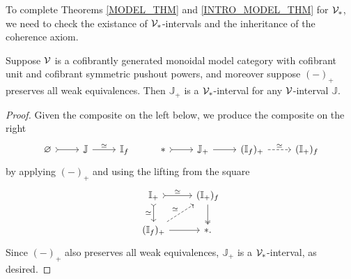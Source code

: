 \documentclass[a4paper,10pt
,draft
]{article}%
\newcommand{\I}{\mathbb I}
\newcommand{\J}{\mathbb J}
\renewcommand{\1}{\eta}%
\begin{document}
{  To complete Theorems \ref{MODEL_THM} and \ref{INTRO_MODEL_THM} for $\V_{\**}$, we need to check the existance of $\V_{\**}$-intervals and the inheritance of the coherence axiom.

  \begin{proposition}
        \label{VPT_INT_PROP}
        Suppose $\mathcal V$ is a cofibrantly generated monoidal model category with cofibrant unit and cofibrant symmetric pushout powers,
        and moreover suppose $(-)_+$ preserves all weak equivalences.
        Then $\J_+$ is a $\V_{\**}$-interval for any $\mathcal V$-interval $\J$.
  \end{proposition}
  \begin{proof}
        Given the composite on the left below, we produce the composite on the right
        \begin{equation}
              \begin{tikzcd}
                    \varnothing \arrow[r, rightarrowtail]
                    &
                    \J \arrow[r, "\simeq"]
                    &
                    \I_f
                    & %
                    \** \arrow[r, rightarrowtail]
                    &
                    \J_+ \arrow[r]
                    &
                    (\I_f)_+ \arrow[r, dashed, "\simeq"]
                    &
                    (\I_+)_f
              \end{tikzcd}
        \end{equation}
        by applying $(-)_+$ and using the lifting from the square
        \begin{equation}
              \label{IFP_IPF_EQ}
              \begin{tikzcd}
                    \I_+ \arrow[d, rightarrowtail, "\simeq"'] \arrow[r, rightarrowtail, "\simeq"]
                    &
                    (\I_+)_f \arrow[d, twoheadrightarrow]
                    \\
                    (\I_f)_+ \arrow[ur, dashed, "\simeq"] \arrow[r]
                    &
                    \**.
              \end{tikzcd}
        \end{equation}
        Since $(-)_+$ also preserves all weak equivalences, $\J_+$ is a $\V_{\**}$-interval, as desired.
  \end{proof}

}
\end{document}
